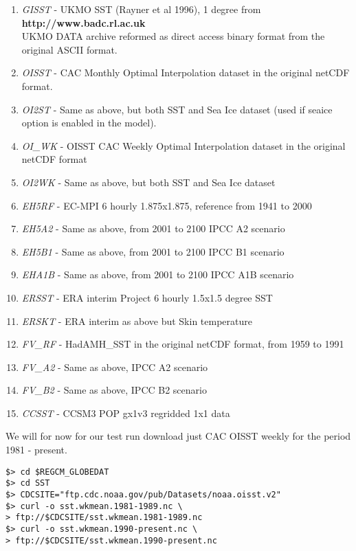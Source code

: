 \begin{enumerate}
\item {\em GISST} - UKMO SST (Rayner et al 1996), 1 degree from \\
{\bf http://www.badc.rl.ac.uk} \\ UKMO DATA archive reformed as direct access
binary format from the original ASCII format.
\item {\em OISST} - CAC Monthly Optimal Interpolation dataset in the original 
netCDF format.
\item {\em OI2ST} - Same as above, but both SST and Sea Ice dataset (used if
seaice option is enabled in the model).
\item {\em OI\_WK} - OISST CAC Weekly Optimal Interpolation dataset in the
original netCDF format
\item {\em OI2WK} - Same as above, but both SST and Sea Ice dataset
\item {\em EH5RF} - EC-MPI 6 hourly 1.875x1.875, reference from 1941 to 2000
\item {\em EH5A2} - Same as above, from 2001 to 2100 IPCC A2 scenario
\item {\em EH5B1} - Same as above, from 2001 to 2100 IPCC B1 scenario
\item {\em EHA1B} - Same as above, from 2001 to 2100 IPCC A1B scenario
\item {\em ERSST} - ERA interim Project 6 hourly 1.5x1.5 degree SST
\item {\em ERSKT} - ERA interim as above but Skin temperature
\item {\em FV\_RF} - HadAMH\_SST in the original netCDF format, from 1959
to 1991
\item {\em FV\_A2} - Same as above, IPCC A2 scenario
\item {\em FV\_B2} - Same as above, IPCC B2 scenario 
\item {\em CCSST} - CCSM3 POP gx1v3 regridded 1x1 data
\end{enumerate}

We will for now for our test run download just CAC OISST weekly for the
period 1981 - present.

\begin{Verbatim}
$> cd $REGCM_GLOBEDAT
$> cd SST
$> CDCSITE="ftp.cdc.noaa.gov/pub/Datasets/noaa.oisst.v2"
$> curl -o sst.wkmean.1981-1989.nc \
> ftp://$CDCSITE/sst.wkmean.1981-1989.nc
$> curl -o sst.wkmean.1990-present.nc \
> ftp://$CDCSITE/sst.wkmean.1990-present.nc
\end{Verbatim}

